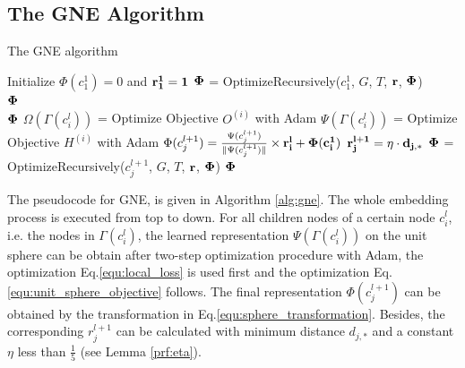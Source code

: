 \documentclass{article}
\theoremstyle{definition}
\begin{document}
    \subsection{The GNE Algorithm}

\begin{algorithm}[H] 
\caption{The GNE algorithm} 
	\label{alg:gne} 
\begin{algorithmic}
	\State Initialize $\Phi(c^1_1) = 0$ and $\bf{r_1^1} = 1$
	\State $\bf{\Phi}$ = OptimizeRecursively($c_1^1$, $G$, $T$, $\bf{r}$, $\bf{\Phi}$) \\
	\Return $\bf{\Phi}$ 
\EndFunction
	\\\hrulefill
{} 
		\Return $\bf{\Phi}$		
	\EndIf
	\State $\Omega(\Gamma(c_i^{l}))$ = Optimize Objective $O^{(i)}$ with Adam
	\State $\Psi(\Gamma(c_i^{l}))$ = Optimize Objective $H^{(i)}$ with Adam
		\State $\Phi(c_j^{l+1}) = \frac{\Psi(c_j^{l+1})}{\lVert \Psi(c_j^{l+1}) \rVert}  \times \bf{r_i^{l}} + \Phi(c_i^{1})$
		\State $\bf{r_j^{l+1}} = \eta \cdot d_{j,*}$
	\EndFor
		\State $\bf{\Phi}$ = OptimizeRecursively($c_j^{l+1}$, $G$, $T$, $\bf{r}$, $\bf{\Phi}$) 
	\EndFor
	\Return $\bf{\Phi}$
\EndFunction
\end{algorithmic} 
\end{algorithm}

	The pseudocode for GNE, is given in Algorithm \ref{alg:gne}. The whole embedding process is executed from top to down. For all children nodes of a certain node $c_i^l$, i.e. the nodes in $\Gamma(c_i^{l})$, the learned representation $\Psi(\Gamma(c_i^{l}))$ on the unit sphere can be obtain after two-step optimization procedure with Adam\cite{Rushing2005ADaM}, the optimization Eq.\ref{equ:local_loss} is used first and the optimization Eq.\ref{equ:unit_sphere_objective} follows.
    The final representation $\Phi(c_j^{l+1})$ can be obtained by the transformation in Eq.\ref{equ:sphere_transformation}. Besides, the corresponding $r_j^{l+1}$ can be calculated with minimum distance $d_{j,*}$ and a constant $\eta$ less than $\frac{1}{5}$ (see Lemma \ref{prf:eta}).
    
\end{document}
